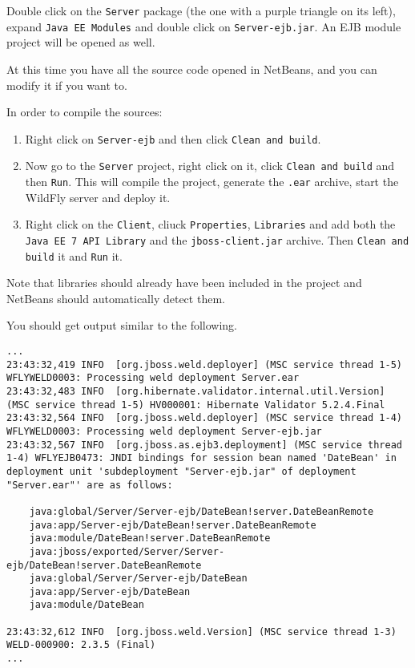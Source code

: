 \documentclass{report}
\begin{document}
Double click on the \texttt{Server} package (the one with a purple triangle on its left), expand \texttt{Java EE Modules} and double click on \texttt{Server-ejb.jar}. An EJB module project will be opened as well. 

At this time you have all the source code opened in NetBeans, and you can modify it if you want to.

In order to compile the sources:
\begin{enumerate}
    \item Right click on \texttt{Server-ejb} and then click \texttt{Clean and build}.
    \item Now go to the \texttt{Server} project, right click on it, click \texttt{Clean and build} and then \texttt{Run}. This will compile the project, generate the \texttt{.ear} archive, start the WildFly server and deploy it.
    \item Right click on the \texttt{Client}, cliuck \texttt{Properties}, \texttt{Libraries} and add both the \texttt{Java EE 7 API Library} and the \texttt{jboss-client.jar} archive. Then
    \texttt{Clean and build} it and \texttt{Run} it. 
\end{enumerate}  

Note that libraries should already have been included in the project and NetBeans should automatically detect them.

You should get output similar to the following.
\begin{lstlisting}[language=ksh]
...
23:43:32,419 INFO  [org.jboss.weld.deployer] (MSC service thread 1-5) WFLYWELD0003: Processing weld deployment Server.ear
23:43:32,483 INFO  [org.hibernate.validator.internal.util.Version] (MSC service thread 1-5) HV000001: Hibernate Validator 5.2.4.Final
23:43:32,564 INFO  [org.jboss.weld.deployer] (MSC service thread 1-4) WFLYWELD0003: Processing weld deployment Server-ejb.jar
23:43:32,567 INFO  [org.jboss.as.ejb3.deployment] (MSC service thread 1-4) WFLYEJB0473: JNDI bindings for session bean named 'DateBean' in deployment unit 'subdeployment "Server-ejb.jar" of deployment "Server.ear"' are as follows:

    java:global/Server/Server-ejb/DateBean!server.DateBeanRemote
    java:app/Server-ejb/DateBean!server.DateBeanRemote
    java:module/DateBean!server.DateBeanRemote
    java:jboss/exported/Server/Server-ejb/DateBean!server.DateBeanRemote
    java:global/Server/Server-ejb/DateBean
    java:app/Server-ejb/DateBean
    java:module/DateBean

23:43:32,612 INFO  [org.jboss.weld.Version] (MSC service thread 1-3) WELD-000900: 2.3.5 (Final)
...
\end{lstlisting}
\end{document}
